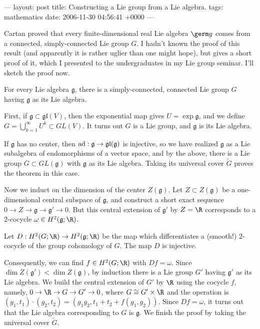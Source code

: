 ---
layout: post
title: Constructing a Lie group from a Lie algebra.
tags: mathematics
date: 2006-11-30 04:56:41 +0000
---

Cartan proved that every finite-dimensional real Lie algebra $\germ g$ comes from a connected, simply-connected Lie group $G$.  I hadn't known the proof of this result (and apparently it is rather uglier than one might hope), but \cite{MR854249} gives a short proof of it, which I presented to the undergraduates in my Lie group seminar.  I'll sketch the proof now.

\begin{theorem}
For every Lie algebra $\mathfrak{g}$, there is a simply-connected, connected Lie group $G$ having $\mathfrak{g}$ as its Lie algebra.
\end{theorem}

First, if $\mathfrak{g} \subset \mathfrak{gl}(V)$, then the exponential map gives $U = \exp \mathfrak{g}$, and we define $G = \bigcup_{k=1}^\infty U^k \subset GL(V)$.  It turns out $G$ is a Lie group, and $\mathfrak{g}$ is its Lie algebra.

If $\mathfrak{g}$ has no center, then $\rm{ad} : \mathfrak{g} \to \mathfrak{gl}(\mathfrak{g})$ is injective, so we have realized $\mathfrak{g}$ as a Lie subalgebra of endomorphisms of a vector space, and by the above, there is a Lie group $G \subset GL(\mathfrak{g})$ with $\mathfrak{g}$ as its Lie algebra.  Taking its universal cover $\tilde{G}$ proves the theorem in this case.

Now we induct on the dimension of the center $Z(\mathfrak{g})$.  Let $Z \subset Z(\mathfrak{g})$ be a one-dimensional central subspace of $\mathfrak{g}$, and construct a short exact sequence $0 \to Z \to \mathfrak{g} \to \mathfrak{g}' \to 0$.  But this central extension of $\mathfrak{g}'$ by $Z = \R$ corresponds to a 2-cocycle $\omega \in H^2(\mathfrak{g}; \R)$.

\begin{lemma}
Let $D : H^2(G;\R) \to H^2(\mathfrak{g}; \R)$ be the map which differentiates a (smooth!) $2$-cocycle of the group cohomology of $G$.  The map $D$ is injective.
\end{lemma}

Consequently, we can find $f \in H^2(G;\R)$ with $Df = \omega$.  Since $\dim Z(\mathfrak{g}') < \dim Z(\mathfrak{g})$, by induction there is a Lie group $G'$ having $\mathfrak{g}'$ as its Lie algebra.  We build the central extension of $G'$ by $\R$ using the cocycle $f$, namely, $0 \to \R \to G \to G' \to 0$, where $G \cong G' \times \R$ and the operation is $(g_1, t_1) \cdot (g_2, t_2) = (g_1 g_2, t_1 + t_2 + f(g_1,g_2))$.  Since $Df = \omega$, it turns out that the Lie algebra corresponding to $G$ is $\mathfrak{g}$.  We finish the proof by taking the universal cover $\tilde{G}$.

